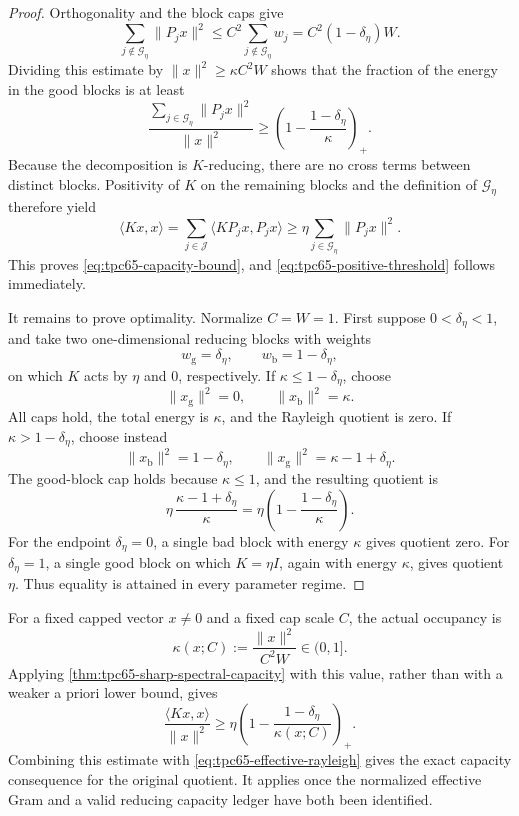 \begin{proof}
Orthogonality and the block caps give
\begin{equation}
  \sum_{j\notin\mathcal G_\eta}\|P_jx\|^2
  \le
  C^2\sum_{j\notin\mathcal G_\eta}w_j
  =
  C^2(1-\delta_\eta)W.
  \label{eq:tpc65-bad-energy-cap}
\end{equation}
Dividing this estimate by
\(\|x\|^2\ge\kappa C^2W\) shows that the fraction of the energy in the good
blocks is at least
\[
  \frac{\sum_{j\in\mathcal G_\eta}\|P_jx\|^2}{\|x\|^2}
  \ge
  \left(
    1-\frac{1-\delta_\eta}{\kappa}
  \right)_+.
\]
Because the decomposition is \(K\)-reducing, there are no cross terms between
distinct blocks.  Positivity of \(K\) on the remaining blocks and the
definition of \(\mathcal G_\eta\) therefore yield
\[
  \langle Kx,x\rangle
  =
  \sum_{j\in\mathcal J}
  \langle KP_jx,P_jx\rangle
  \ge
  \eta
  \sum_{j\in\mathcal G_\eta}\|P_jx\|^2.
\]
This proves \eqref{eq:tpc65-capacity-bound}, and
\eqref{eq:tpc65-positive-threshold} follows immediately.

It remains to prove optimality.  Normalize \(C=W=1\).  First suppose
\(0<\delta_\eta<1\), and take two one-dimensional reducing blocks with
weights
\[
  w_{\mathrm g}=\delta_\eta,
  \qquad
  w_{\mathrm b}=1-\delta_\eta,
\]
on which \(K\) acts by \(\eta\) and \(0\), respectively.  If
\(\kappa\le 1-\delta_\eta\), choose
\[
  \|x_{\mathrm g}\|^2=0,
  \qquad
  \|x_{\mathrm b}\|^2=\kappa.
\]
All caps hold, the total energy is \(\kappa\), and the Rayleigh quotient is
zero.  If \(\kappa>1-\delta_\eta\), choose instead
\[
  \|x_{\mathrm b}\|^2=1-\delta_\eta,
  \qquad
  \|x_{\mathrm g}\|^2=\kappa-1+\delta_\eta.
\]
The good-block cap holds because \(\kappa\le1\), and the resulting quotient is
\[
  \eta\,
  \frac{\kappa-1+\delta_\eta}{\kappa}
  =
  \eta
  \left(
    1-\frac{1-\delta_\eta}{\kappa}
  \right).
\]
For the endpoint \(\delta_\eta=0\), a single bad block with energy
\(\kappa\) gives quotient zero.  For \(\delta_\eta=1\), a single good block
on which \(K=\eta I\), again with energy \(\kappa\), gives quotient \(\eta\).
Thus equality is attained in every parameter regime.
\end{proof}

\begin{remark}
\label{rem:tpc65-actual-occupancy}
For a fixed capped vector \(x\ne0\) and a fixed cap scale \(C\), the actual
occupancy is
\begin{equation}
  \kappa(x;C)
  :=
  \frac{\|x\|^2}{C^2W}
  \in(0,1].
  \label{eq:tpc65-actual-occupancy}
\end{equation}
Applying \cref{thm:tpc65-sharp-spectral-capacity} with this value, rather than
with a weaker a priori lower bound, gives
\[
  \frac{\langle Kx,x\rangle}{\|x\|^2}
  \ge
  \eta
  \left(
    1-\frac{1-\delta_\eta}{\kappa(x;C)}
  \right)_+.
\]
Combining this estimate with \eqref{eq:tpc65-effective-rayleigh} gives the
exact capacity consequence for the original quotient.  It applies once the
normalized effective Gram and a valid reducing capacity ledger have both been
identified.
\end{remark}


